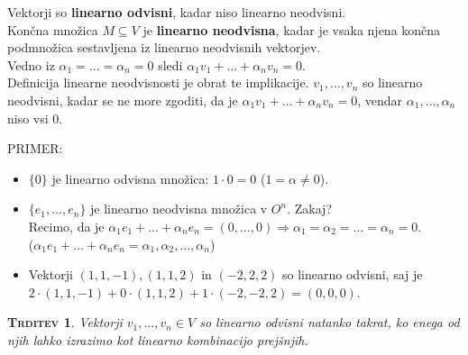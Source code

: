\documentclass[a4paper,12pt]{article}
\newtheorem*{trditev}{\textsc{Trditev}}
\begin{document}
\noindent Vektorji so \textbf{linearno odvisni}, kadar niso linearno neodvisni. \\

\noindent  Končna množica $M\subseteq V$ je \textbf{linearno neodvisna}, kadar je vsaka njena končna podmnožica sestavljena iz linearno neodvisnih vektorjev. \\

\noindent Vedno iz $\alpha_1=\ldots=\alpha_n=0$ sledi $\alpha_1v_1+\ldots+\alpha_nv_n=0$. \\

\noindent Definicija linearne neodvisnosti je obrat te implikacije. $v_1,\ldots,v_n$ so linearno neodvisni, kadar se ne more zgoditi, da je $\alpha_1v_1+\ldots+\alpha_nv_n=0$, vendar $\alpha_1,\ldots,\alpha_n$ niso vsi 0. \\

\newpage 

\noindent PRIMER:
\begin{itemize}
\item $\{0\}$ je linearno odvisna množica: $1\cdot 0=0$ ($1=\alpha\neq0$).
\item $\{e_1,\ldots,e_n\}$ je linearno neodvisna množica v $O^n$. Zakaj? \\

Recimo, da je $\alpha_1e_1+\ldots+\alpha_ne_n=(0,\ldots,0) \Rightarrow \alpha_1=\alpha_2=\ldots=\alpha_n=0$. \\

($\alpha_1e_1+\ldots+\alpha_ne_n=\alpha_1,\alpha_2,\ldots,\alpha_n$)

\item Vektorji $(1,1,-1),(1,1,2)$ in $(-2,2,2)$ so linearno odvisni, saj je \linebreak $2\cdot(1,1,-1) + 0\cdot(1,1,2)+1\cdot(-2,-2,2)=(0,0,0)$. \\
\end{itemize}

\begin{trditev}
Vektorji $v_1,\ldots,v_n\in V$ so linearno odvisni natanko takrat, ko enega od njih lahko izrazimo kot linearno kombinacijo prejšnjih. \\
\end{trditev}
\end{document}
